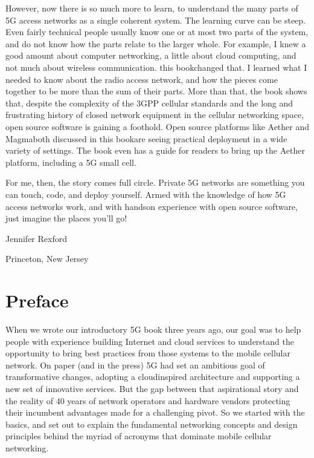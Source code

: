 \documentclass[a4paper,11pt,english]{sphinxmanual}
\begin{document}
\sphinxAtStartPar
However, now there is so much more to learn, to understand the many
parts of 5G access networks as a single coherent system. The learning
curve can be steep. Even fairly technical people usually know one or
at most two parts of the system, and do not know how the parts relate
to the larger whole. For example, I knew a good amount about computer
networking, a little about cloud computing, and not much about
wireless communication. \textendash{}this
book\textendash{}changed that. I learned what I needed to know about the radio
access network, and how the pieces come together to be more than the
sum of their parts. More than that, the book shows that, despite the
complexity of the 3GPP cellular standards and the long and frustrating
history of closed network equipment in the cellular networking space,
open source software is gaining a foothold. Open source platforms like
Aether and Magma\textendash{}both discussed in this book\textendash{}are seeing practical
deployment in a wide variety of settings. The book even has a guide
for readers to bring up the Aether platform, including a 5G small
cell.

\sphinxAtStartPar
For me, then, the story comes full circle. Private 5G networks are
something you can touch, code, and deploy yourself. Armed with the
knowledge of how 5G access networks work, and with hands\sphinxhyphen{}on experience
with open source software, just imagine the places you’ll go!

\begin{DUlineblock}{0em}
\item[] Jennifer Rexford
\item[] Princeton, New Jersey
\end{DUlineblock}


\chapter*{Preface}
\label{\detokenize{preface:preface}}\label{\detokenize{preface::doc}}
\sphinxAtStartPar
When we wrote our introductory 5G book three years ago, our goal was
to help people with experience building Internet and cloud services to
understand the opportunity to bring best practices from those systems
to the mobile cellular network. On paper (and in the press) 5G had set
an ambitious goal of transformative changes, adopting a cloud\sphinxhyphen{}inspired
architecture and supporting a new set of innovative services. But the
gap between that aspirational story and the reality of 40 years of
network operators and hardware vendors protecting their incumbent
advantages made for a challenging pivot. So we started with the
basics, and set out to explain the fundamental networking concepts and
design principles behind the myriad of acronyms that dominate mobile
cellular networking.
\end{document}
